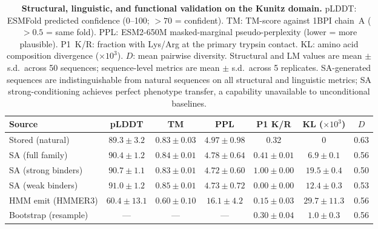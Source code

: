 \documentclass[journal=jcisd8,manuscript=article]{achemso}
\theoremstyle{definition}
\theoremstyle{remark}
\begin{document}
\begin{table}[p]
  \centering
  \caption{\textbf{Structural, linguistic, and functional validation on the Kunitz domain.}
  pLDDT: ESMFold predicted confidence (0--100; $>70$ = confident).
  TM: TM-score against 1BPI chain~A ($>0.5$ = same fold).
  PPL: ESM2-650M masked-marginal pseudo-perplexity (lower = more plausible).
  P1~K/R: fraction with Lys/Arg at the primary trypsin contact.
  KL: amino acid composition divergence ($\times 10^{3}$).
  $D$: mean pairwise diversity.
  Structural and LM values are mean $\pm$ s.d.\ across 50 sequences;
  sequence-level metrics are mean $\pm$ s.d.\ across 5 replicates.
  SA-generated sequences are indistinguishable from natural sequences on all
  structural and linguistic metrics; SA strong-conditioning achieves perfect
  phenotype transfer, a capability unavailable to unconditional baselines.}
  \label{tab:structure-validation}
  \small
  \begin{tabular}{lcccccc}
    \toprule
    Source & pLDDT & TM & PPL & P1 K/R & KL ($\times 10^{3}$) & $D$ \\
    \midrule
    Stored (natural)      & $89.3 \pm 3.2$  & $0.83 \pm 0.03$ & $4.97 \pm 0.98$ & 0.32 & 0 & 0.63 \\
    SA (full family)      & $90.4 \pm 1.2$  & $0.84 \pm 0.01$ & $4.78 \pm 0.64$ & $0.41 \pm 0.01$ & $6.9 \pm 0.1$ & 0.56 \\
    SA (strong binders)   & $90.7 \pm 1.1$  & $0.83 \pm 0.01$ & $4.72 \pm 0.60$ & $1.00 \pm 0.00$ & $19.5 \pm 0.4$ & 0.50 \\
    SA (weak binders)     & $91.0 \pm 1.2$  & $0.85 \pm 0.01$ & $4.73 \pm 0.72$ & $0.00 \pm 0.00$ & $12.4 \pm 0.3$ & 0.53 \\
    HMM emit (HMMER3)     & $60.4 \pm 13.1$ & $0.60 \pm 0.10$ & $16.1 \pm 4.2$  & $0.15 \pm 0.03$ & $29.7 \pm 11.3$ & 0.56 \\
    Bootstrap (resample)  & ---             & ---              & ---              & $0.30 \pm 0.04$ & $1.0 \pm 0.3$ & 0.56 \\
    \bottomrule
  \end{tabular}
\end{table}
\end{document}

